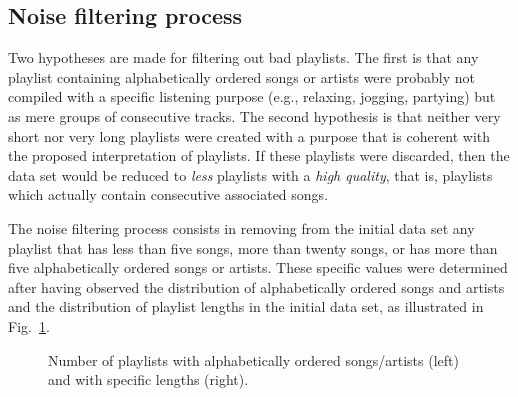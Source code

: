 % 
% 


\subsection{Noise filtering process} %

Two hypotheses are made for filtering out bad playlists.
The first is that any playlist containing alphabetically ordered songs or artists were probably not compiled with a specific listening purpose (e.g., relaxing, jogging, partying) but as mere groups of consecutive tracks.
The second hypothesis is that neither very short nor very long playlists were created with a purpose that is coherent with the proposed interpretation of playlists.
If these playlists were discarded, then the data set would be reduced to \emph{less} playlists with a \emph{high quality}, that is, playlists which actually contain consecutive associated songs.

The noise filtering process consists in removing from the initial data set any playlist that has less than five songs, more than twenty songs, or has more than five alphabetically ordered songs or artists.
These specific values were determined after having observed the distribution of  alphabetically ordered songs and artists and the distribution of playlist lengths in the initial data set, as illustrated in Fig.~\ref{fig:alphabetical}.
%
\begin{figure}[hbtp]
\centering \setlength{\abovecaptionskip}{3pt}
\caption{Number of playlists with alphabetically ordered songs/artists (left) and with specific lengths (right).}
\label{fig:alphabetical}
\end{figure}

